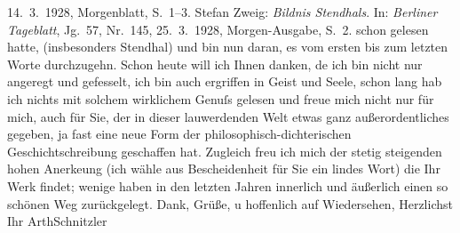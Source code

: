 {{{                        14. 3. 1928, Morgenblatt, S. 1–3. Stefan Zweig: \emph{Bildnis Stendhals}. In: \emph{Berliner Tageblatt}, Jg. 57, Nr. 145, 25. 3. 1928,
                     Morgen-Ausgabe, S. 2. }}}\label{K_L03757-2} schon gelesen hatte, (insbesonders Stendhal) und bin nun daran, es vom ersten bis zum letzten Worte durchzugehn. Schon
               heute will ich Ihnen danken, de{\geminationn} ich bin nicht nur
               angeregt und gefesselt, ich bin auch ergriffen in Geist und Seele, schon lang hab ich
               nichts mit solchem wirklichem Genuſs gelesen und freue mich nicht nur für mich, auch
               für Sie, der in dieser lauwerdenden Welt etwas ganz außerordentliches gegeben, ja
               fast eine neue Form der philosophisch-dichterischen {\pb}Geschichtschreibung geschaffen hat. Zugleich freu ich mich der stetig steigenden
               hohen Anerke{\geminationn}ung (ich wähle aus Bescheidenheit für Sie
               ein lindes Wort) die Ihr Werk findet; wenige haben in den letzten Jahren innerlich
               und äußerlich einen so schönen Weg zurückgelegt. Dank, Grüße, u hoffenlich auf
               Wiedersehen,\pend
           \pstart Herzlichst Ihr \spacefill\mbox{ArthSchnitzler}\pend{}\endnumbering{}
\begin{anhang}
\end{anhang}
      